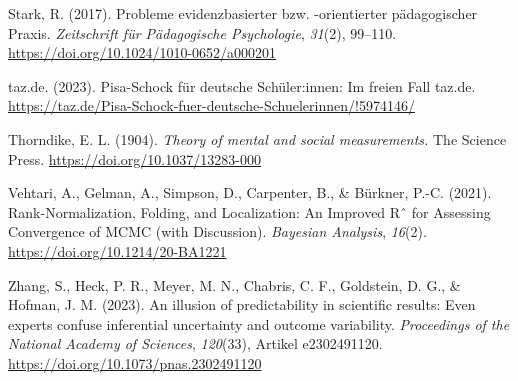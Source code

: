 \documentclass[
  jou,
  floatsintext,
  longtable,
  nolmodern,
  notxfonts,
  notimes,
  colorlinks=true,linkcolor=blue,citecolor=blue,urlcolor=blue]{apa7}
\newlength{\cslhangindent}
\newenvironment{CSLReferences}[2] %
 {\begin{list}{}{%
  \setlength{\itemindent}{0pt}
  \setlength{\leftmargin}{0pt}
  \setlength{\parsep}{0pt}
  \ifodd #1
   \setlength{\leftmargin}{\cslhangindent}
   \setlength{\itemindent}{-1\cslhangindent}
  \fi
  \setlength{\itemsep}{#2\baselineskip}}}
 {\end{list}}
\begin{document}
\begin{CSLReferences}{1}{0}
Stark, R. (2017). Probleme evidenzbasierter bzw. -orientierter
pädagogischer Praxis. \emph{Zeitschrift für Pädagogische Psychologie},
\emph{31}(2), 99--110. \url{https://doi.org/10.1024/1010-0652/a000201}

taz.de. (2023). Pisa-Schock für deutsche Schü­le­r:in­nen: Im freien Fall
\textbar{} taz.de.
\url{https://taz.de/Pisa-Schock-fuer-deutsche-Schuelerinnen/!5974146/}

Thorndike, E. L. (1904). \emph{Theory of mental and social
measurements.} The Science Press.
\url{https://doi.org/10.1037/13283-000}

Vehtari, A., Gelman, A., Simpson, D., Carpenter, B., \& Bürkner, P.-C.
(2021). Rank-Normalization, Folding, and Localization: An Improved Rˆ
for Assessing Convergence of MCMC (with Discussion). \emph{Bayesian
Analysis}, \emph{16}(2). \url{https://doi.org/10.1214/20-BA1221}

Zhang, S., Heck, P. R., Meyer, M. N., Chabris, C. F., Goldstein, D. G.,
\& Hofman, J. M. (2023). An illusion of predictability in scientific
results: Even experts confuse inferential uncertainty and outcome
variability. \emph{Proceedings of the National Academy of Sciences},
\emph{120}(33), Artikel e2302491120.
\url{https://doi.org/10.1073/pnas.2302491120}

\end{CSLReferences}
\end{document}
